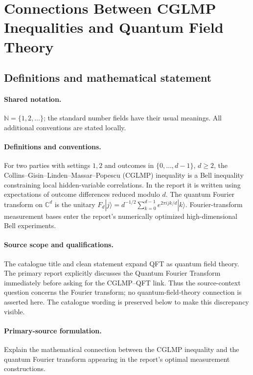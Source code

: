 \documentclass[11pt]{article}
\begin{document}
\section{Connections Between CGLMP Inequalities and Quantum Field Theory}\label{statement}

\subsection{Definitions and mathematical statement}

\paragraph{Shared notation.}$\mathbb N=\{1,2,\ldots\}$; the standard number fields have their usual meanings. All additional conventions are stated locally.


\paragraph{Definitions and conventions.} For two parties with settings $1,2$ and outcomes in $\{0,\ldots,d-1\}$, $d\ge2$, the Collins--Gisin--Linden--Massar--Popescu (CGLMP) inequality is a Bell inequality constraining local hidden-variable correlations. In the report it is written using expectations of outcome differences reduced modulo $d$. The quantum Fourier transform on $\mathbb C^d$ is the unitary $F_d|j\rangle=d^{-1/2}\sum_{k=0}^{d-1}e^{2\pi ijk/d}|k\rangle$. Fourier-transform measurement bases enter the report's numerically optimized high-dimensional Bell experiments.

\paragraph{Source scope and qualifications.} The catalogue title and clean statement expand QFT as quantum field theory. The primary report explicitly discusses the Quantum Fourier Transform immediately before asking for the CGLMP--QFT link. Thus the source-context question concerns the Fourier transform; no quantum-field-theory connection is asserted here. The catalogue wording is preserved below to make this discrepancy visible.

\paragraph{Primary-source formulation.} Explain the mathematical connection between the CGLMP inequality and the quantum Fourier transform appearing in the report's optimal measurement constructions.
\end{document}
